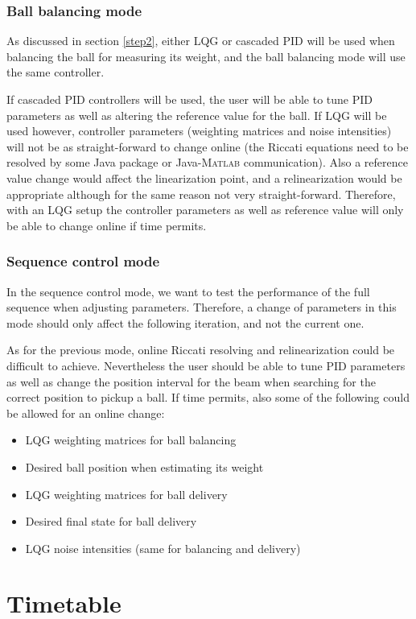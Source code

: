 \documentclass{article}
\begin{document}
\subsubsection{Ball balancing mode}
As discussed in section \ref{step2}, either LQG or cascaded PID will be used when balancing the ball for measuring its weight, and the ball balancing mode will use the same controller.

If cascaded PID controllers will be used, the user will be able to tune PID parameters as well as altering the reference value for the ball. If LQG will be used however, controller parameters (weighting matrices and noise intensities) will not be as straight-forward to change online (the Riccati equations need to be resolved by some Java package or Java-\textsc{Matlab} communication). Also a reference value change would affect the linearization point, and a relinearization would be appropriate although for the same reason not very straight-forward. Therefore, with an LQG setup the controller parameters as well as reference value will only be able to change online if time permits.

\subsubsection{Sequence control mode}
In the sequence control mode, we want to test the performance of the full sequence when adjusting parameters. Therefore, a change of parameters in this mode should only affect the following iteration, and not the current one.

As for the previous mode, online Riccati resolving and relinearization could be difficult to achieve. Nevertheless the user should be able to tune PID parameters as well as change the position interval for the beam when searching for the correct position to pickup a ball. If time permits, also some of the following could be allowed for an online change:
\begin{itemize}
\item LQG weighting matrices for ball balancing
\item Desired ball position when estimating its weight
\item LQG weighting matrices for ball delivery
\item Desired final state for ball delivery
\item LQG noise intensities (same for balancing and delivery)
\end{itemize}

\section{Timetable}
\end{document}
